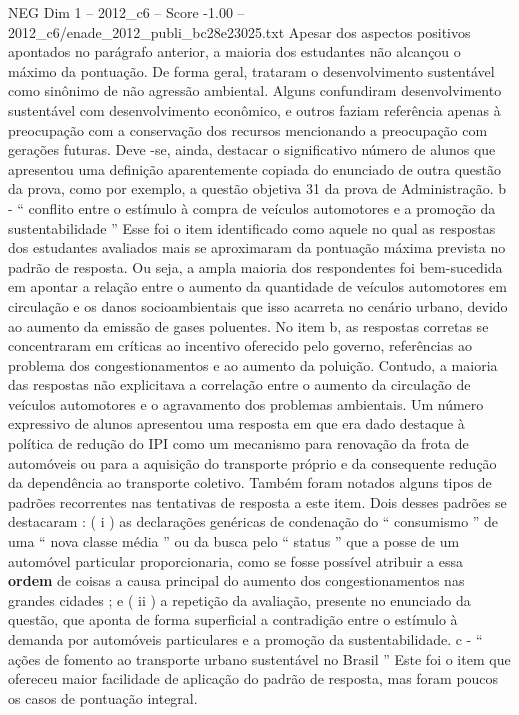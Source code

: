 \begin{textsample}{NEG Dim 1 – 2012\_c6 – Score -1.00 – 2012\_c6/enade\_2012\_publi\_bc28e23025.txt}
Apesar dos aspectos positivos apontados no parágrafo anterior, a maioria dos estudantes não alcançou o máximo da pontuação.
De forma geral, trataram o desenvolvimento sustentável como sinônimo de não agressão ambiental.
Alguns confundiram desenvolvimento sustentável com desenvolvimento econômico, e outros faziam referência apenas à preocupação com a conservação dos recursos mencionando a preocupação com gerações futuras.
Deve -se, ainda, destacar o significativo número de alunos que apresentou uma definição aparentemente copiada do enunciado de outra questão da prova, como por exemplo, a questão objetiva 31 da prova de Administração. b - “ conflito entre o estímulo à compra de veículos automotores e a promoção da sustentabilidade ” Esse foi o item identificado como aquele no qual as respostas dos estudantes avaliados mais se aproximaram da pontuação máxima prevista no padrão de resposta.
Ou seja, a ampla maioria dos respondentes foi bem-sucedida em apontar a relação entre o aumento da quantidade de veículos automotores em circulação e os danos socioambientais que isso acarreta no cenário urbano, devido ao aumento da emissão de gases poluentes.
No item b, as respostas corretas se concentraram em críticas ao incentivo oferecido pelo governo, referências ao problema dos congestionamentos e ao aumento da poluição.
Contudo, a maioria das respostas não explicitava a correlação entre o aumento da circulação de veículos automotores e o agravamento dos problemas ambientais.
Um número expressivo de alunos apresentou uma resposta em que era dado destaque à política de redução do IPI como um mecanismo para renovação da frota de automóveis ou para a aquisição do transporte próprio e da consequente redução da dependência ao transporte coletivo.
Também foram notados alguns tipos de padrões recorrentes nas tentativas de resposta a este item.
Dois desses padrões se destacaram : ( i ) as declarações genéricas de condenação do “ consumismo ” de uma “ nova classe média ” ou da busca pelo “ status ” que a posse de um automóvel particular proporcionaria, como se fosse possível atribuir a essa \textbf{ordem} de coisas a causa principal do aumento dos congestionamentos nas grandes cidades ; e ( ii ) a repetição da avaliação, presente no enunciado da questão, que aponta de forma superficial a contradição entre o estímulo à demanda por automóveis particulares e a promoção da sustentabilidade. c - “ ações de fomento ao transporte urbano sustentável no Brasil ” Este foi o item que ofereceu maior facilidade de aplicação do padrão de resposta, mas foram poucos os casos de pontuação integral.

\end{textsample}
